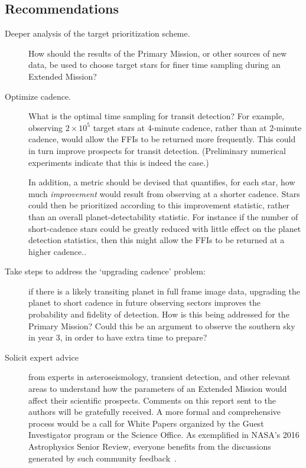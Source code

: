 \subsection{Recommendations}
\label{sec:recommendations}
\begin{description}
  
	\item[Deeper analysis of the target prioritization scheme.] How should the
	results of the Primary Mission, or other sources of new data, be used to
	choose target stars for finer time sampling during an Extended Mission?
	
    \item[Optimize cadence.] What is the optimal time sampling for transit 
    detection? For example, observing $2\times10^5$ target stars at 
    4-minute cadence, rather than at 2-minute cadence,
    would allow the FFIs to be returned more frequently.
    This could in turn improve prospects for transit detection.  
    (Preliminary numerical experiments indicate that this is indeed the 
    case.)
	      
	      In addition, a metric should be devised that
        quantifies, for each star, how much {\it improvement} would
        result from observing at a shorter cadence.
        Stars could then be prioritized according to this improvement
	statistic, rather than an overall planet-detectability statistic.
        For instance if the number of short-cadence stars could be 
        greatly reduced with little effect on the planet detection
        statistics, then this might allow the FFIs to be returned at a
        higher cadence..
	
	\item[Take steps to address the `upgrading cadence' problem:]
          if there is a likely transiting planet in full frame image
          data, upgrading the planet to short cadence in future
          observing sectors improves the probability and fidelity of
          detection. How is this being addressed for the Primary Mission?
          Could this be an argument to observe the southern
          sky in year 3, in order to have extra time to prepare?
	
	\item[Solicit expert advice] from experts in asteroseismology, transient detection,
	and other relevant areas to understand how the parameters of an Extended Mission
          would affect their scientific prospects. Comments on this report sent to
	  the authors will be gratefully received. A more formal and comprehensive process would
          be a call for White Papers organized
	  by the Guest Investigator program or the \tess Science Office. As
          exemplified in NASA’s 2016 Astrophysics Senior Review,
          everyone benefits from the discussions generated by such
          community feedback~\citep{donahue_senior_2016}.
	

\end{description}
